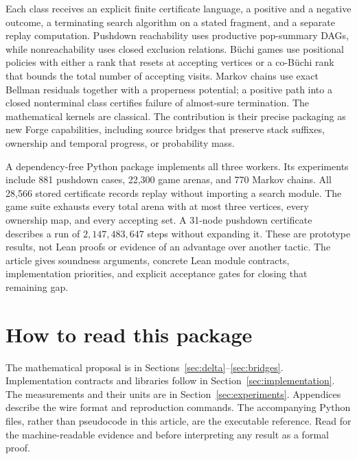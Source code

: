 \documentclass[11pt,letterpaper]{article}
\theoremstyle{definition}
\newcommand{\code}[1]{\texttt{\detokenize{#1}}}
\begin{document}
Each class receives an explicit finite certificate language, a positive and a
negative outcome, a terminating search algorithm on a stated fragment, and a
separate replay computation. Pushdown reachability uses productive pop-summary
DAGs, while nonreachability uses closed exclusion relations. B\"uchi games use
positional policies with either a rank that resets at accepting vertices or a
co-B\"uchi rank that bounds the total number of accepting visits. Markov chains
use exact Bellman residuals together with a properness potential; a positive
path into a closed nonterminal class certifies failure of almost-sure
termination. The mathematical kernels are classical. The contribution is their
precise packaging as new Forge capabilities, including source bridges that
preserve stack suffixes, ownership and temporal progress, or probability mass.

A dependency-free Python package implements all three workers. Its experiments
include 881 pushdown cases, 22,300 game arenas, and 770 Markov chains. All 28,566
stored certificate records replay without importing a search module. The game
suite exhausts every total arena with at most three vertices, every ownership
map, and every accepting set. A 31-node pushdown certificate describes a run of
$2,147,483,647$ steps without expanding it. These are prototype results, not Lean
proofs or evidence of an advantage over another tactic. The article gives
soundness arguments, concrete Lean module contracts, implementation priorities,
and explicit acceptance gates for closing that remaining gap.

\section*{How to read this package}
The mathematical proposal is in Sections~\ref{sec:delta}--\ref{sec:bridges}.
Implementation contracts and libraries follow in Section~\ref{sec:implementation}.
The measurements and their units are in Section~\ref{sec:experiments}.
Appendices describe the wire format and reproduction commands. The accompanying
Python files, rather than pseudocode in this article, are the executable
reference. Read \code{results/summary.json} for the machine-readable evidence
and \code{docs/STATUS.md} before interpreting any result as a formal proof.
\clearpage
\tableofcontents
\clearpage
{}








\appendix


\end{document}

